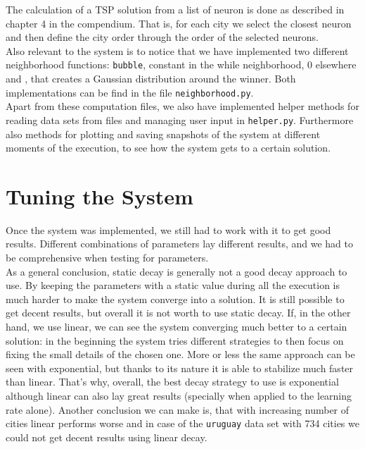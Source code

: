 \documentclass[11pt]{article}
\begin{document}
The calculation of a TSP solution from a list of neuron is done as described in
chapter 4 in the compendium. That is, for each city we select the closest neuron
and then define the city order through the order of the selected neurons.\\

Also relevant to the system is to notice that we have implemented two different
neighborhood functions: \texttt{bubble}, constant in the while neighborhood, 0
elsewhere and , that creates a Gaussian distribution around the
winner. Both implementations can be find in the file
\texttt{neighborhood.py}.\\

Apart from these computation files, we also have implemented helper methods for
reading data sets from files and managing user input  in \texttt{helper.py}.
Furthermore also methods for plotting and saving snapshots of the system at
different moments of the execution, to see how the system gets to a certain
solution.\\


\section{Tuning the System}

Once the system was implemented, we still had to work with it to get good
results. Different combinations of parameters lay different results,
and we had to be comprehensive when testing for parameters.\\

As a general conclusion, static decay is generally not a good decay approach to
use. By keeping the parameters with a static value during all the execution is
much harder to make the system converge into a solution. It is still possible to
get decent results, but overall it is not worth to use static decay. If, in the
other hand, we use linear, we can see the system converging much better to a
certain solution: in the beginning the system tries different strategies to then
focus on fixing the small details of the chosen one. More or less the same
approach can be seen with exponential, but thanks to its nature it is able to
stabilize much faster than linear. That's why, overall, the best decay strategy
to use is exponential although linear can also lay great results (specially when
applied to the learning rate alone). Another conclusion we can make is, that
with increasing number of cities linear performs worse and in case of the
\texttt{uruguay} data set with 734 cities we could not get decent results using
linear decay.\\
\end{document}
